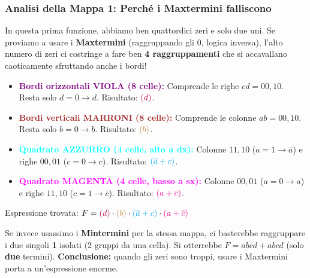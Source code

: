 \documentclass[11pt,a4paper]{report}
\begin{document}
\subsubsection*{Analisi della Mappa 1: Perché i Maxtermini falliscono}
In questa prima funzione, abbiamo ben quattordici zeri e solo due uni. Se proviamo a usare i \textbf{Maxtermini} (raggruppando gli 0, logica inversa), l'alto numero di zeri ci costringe a fare ben \textbf{4 raggruppamenti} che si accavallano caoticamente sfruttando anche i bordi!
\begin{itemize}
    \item \textcolor{purple}{\textbf{Bordi orizzontali VIOLA (8 celle):}} Comprende le righe $cd=00,10$. Resta solo $d=0 \to d$. Risultato: $\textcolor{purple}{(d)}$.
    \item \textcolor{brown}{\textbf{Bordi verticali MARRONI (8 celle):}} Comprende le colonne $ab=00,10$. Resta solo $b=0 \to b$. Risultato: $\textcolor{brown}{(b)}$.
    \item \textcolor{cyan}{\textbf{Quadrato AZZURRO (4 celle, alto a dx):}} Colonne $11,10$ ($a=1 \to \overline{a}$) e righe $00,01$ ($c=0 \to c$). Risultato: $\textcolor{cyan}{(\overline{a}+c)}$.
    \item \textcolor{magenta}{\textbf{Quadrato MAGENTA (4 celle, basso a sx):}} Colonne $00,01$ ($a=0 \to a$) e righe $11,10$ ($c=1 \to \overline{c}$). Risultato: $\textcolor{magenta}{(a+\overline{c})}$.
\end{itemize}
Espressione trovata: $F = \textcolor{purple}{(d)} \cdot \textcolor{brown}{(b)} \cdot \textcolor{cyan}{(\overline{a}+c)} \cdot \textcolor{magenta}{(a+\overline{c})}$

Se invece usassimo i \textbf{Mintermini} per la stessa mappa, ci basterebbe raggruppare i due singoli \textbf{1} isolati (2 gruppi da una cella). Si otterrebbe $F = \overline{a}b\overline{c}d + abcd$ (solo \textbf{due} termini). \textbf{Conclusione:} quando gli zeri sono troppi, usare i Maxtermini porta a un'espressione enorme.

\vspace{1.5em}
\end{document}
